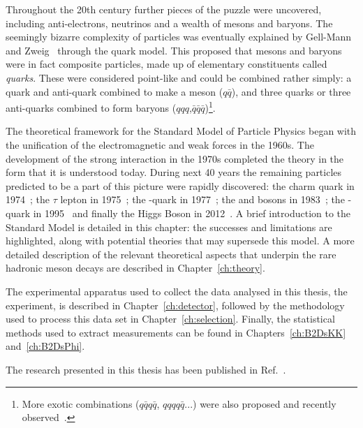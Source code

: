 Throughout the 20th century further pieces of the puzzle were uncovered, including anti-electrons, neutrinos and a wealth of mesons and baryons. 
The seemingly bizarre complexity of particles was eventually explained by Gell-Mann~\cite{GellMann:1964nj} and Zweig~\cite{Zweig:1964jf} through the quark model. This proposed that mesons and baryons were in fact composite particles, made up of elementary constituents called \emph{quarks}. These were considered point-like and could be combined rather simply: a quark and anti-quark combined to make a meson ($q\bar{q}$), and three quarks or three anti-quarks combined to form baryons ($qqq$,$\bar{q}\bar{q}\bar{q}$)\footnote{More exotic combinations ($q\bar{q}q\bar{q}$, $qqqq\bar{q}$...) were also proposed and recently observed~\cite{PhysRevLett.91.262001,PhysRevLett.115.072001}.}.     

The theoretical framework for the Standard Model of Particle Physics began with the unification of the electromagnetic and weak forces in the 1960s. The development of the strong interaction in the 1970s completed the theory in the form that it is understood today. During next 40 years the remaining particles predicted to be a part of this picture were rapidly discovered: the charm quark in 1974~\cite{PhysRevLett.33.1406,PhysRevLett.33.1404}; the $\tau$ lepton in 1975~\cite{PhysRevLett.35.1489}; the \bquark-quark in 1977~\cite{PhysRevLett.39.252}; the \W and \Z bosons in 1983~\cite{Arnison:1983rp,Banner:1983jy}; the \tquark-quark in 1995~\cite{PhysRevLett.74.2626,PhysRevLett.74.2422} and finally the Higgs Boson in 2012~\cite{Aad:2012tfa,Chatrchyan:2012xdj}.      
A brief introduction to the Standard Model is detailed in this chapter: the successes and limitations are highlighted, along with potential theories that may supersede this model.
A more detailed description of the relevant theoretical aspects that underpin the rare hadronic \B meson decays are described in Chapter~\ref{ch:theory}. 

The experimental apparatus used to collect the data analysed in this thesis, the \lhcb experiment, is described in Chapter~\ref{ch:detector}, followed by the methodology used to process this data set in Chapter~\ref{ch:selection}. Finally, the statistical methods used to extract measurements can be found in Chapters~\ref{ch:B2DsKK} and~\ref{ch:B2DsPhi}.

The research presented in this thesis has been published in Ref.~\cite{LHCb-PAPER-2017-032}. 



